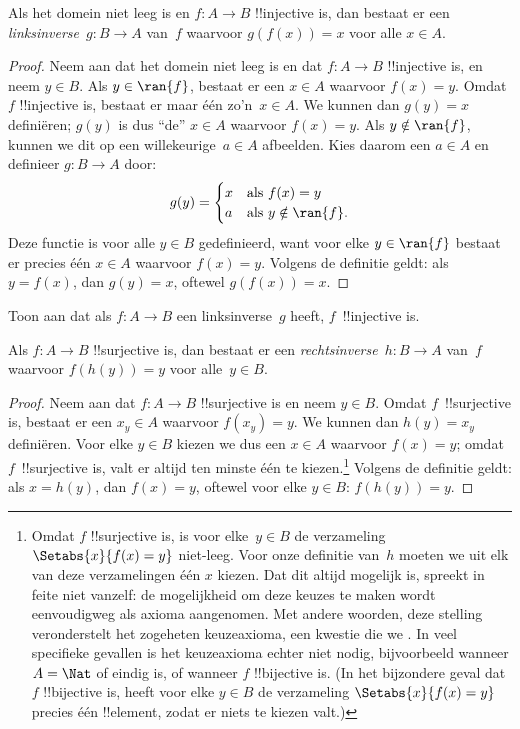 \documentclass[../../../include/open-logic-section]{subfiles}
\begin{document}
\begin{prop}
Als het domein niet leeg is en $f\colon A \to B$ !!{injective} is, dan
bestaat er een
\emph{linksinverse}~$g\colon B \to A$ van~$f$ waarvoor
$g(f(x)) = x$ voor alle $x \in A$.
\end{prop}

\begin{proof}
Neem aan dat het domein niet leeg is en dat $f\colon A \to B$
!!{injective} is, en neem $y \in B$.
Als $y \in \ran{f}$, bestaat er een $x \in A$ waarvoor $f(x) = y$.
Omdat $f$ !!{injective} is, bestaat er maar één zo'n~$x \in A$. We
kunnen dan $g(y) = x$ definiëren; $g(y)$ is dus ``de'' $x \in A$
waarvoor $f(x) = y$. Als $y \notin \ran{f}$, kunnen we dit op een
willekeurige~$a \in A$ afbeelden. Kies daarom een $a \in A$ en
definieer $g\colon B \to A$ door:
\[
g(y) = \begin{cases}
    x & \text{als $f(x) = y$}\\
    a & \text{als $y \notin \ran{f}$.}
\end{cases}
\]
Deze functie is voor alle $y \in B$ gedefinieerd, want voor elke
$y \in \ran{f}$ bestaat er precies één $x \in A$ waarvoor $f(x) = y$.
Volgens de definitie geldt: als $y = f(x)$, dan $g(y) = x$, oftewel
$g(f(x)) = x$.
\end{proof}

\begin{prob}
Toon aan dat als $f\colon A \to B$ een linksinverse~$g$ heeft,
$f$~!!{injective} is.
\end{prob}

\begin{prop}
    Als $f\colon A \to B$ !!{surjective} is, dan bestaat er een
    \emph{rechtsinverse}~$h\colon B \to A$ van~$f$ waarvoor
    $f(h(y)) = y$ voor alle~$y \in B$.
\end{prop}

\begin{proof}
Neem aan dat $f\colon A \to B$ !!{surjective} is en neem $y \in B$.
Omdat $f$~!!{surjective} is, bestaat er een $x_y \in A$ waarvoor
$f(x_y) = y$. We kunnen dan $h(y) = x_y$ definiëren. Voor elke
$y \in B$ kiezen we dus een $x \in A$ waarvoor $f(x) = y$; omdat
$f$~!!{surjective} is, valt er altijd ten minste één te
kiezen.\footnote{Omdat $f$ !!{surjective} is, is voor elke~$y \in B$
de verzameling $\Setabs{x}{f(x) = y}$ niet-leeg. Voor onze definitie
van~$h$ moeten we uit elk van deze verzamelingen één $x$ kiezen. Dat
dit altijd mogelijk is, spreekt in feite niet vanzelf: de mogelijkheid
om deze keuzes te maken wordt eenvoudigweg als axioma aangenomen. Met
andere woorden, deze stelling veronderstelt het zogeheten
keuzeaxioma, een kwestie die we
.
In veel specifieke gevallen is het keuzeaxioma echter niet nodig,
bijvoorbeeld wanneer $A = \Nat$ of eindig is, of wanneer $f$
!!{bijective} is. (In het bijzondere geval dat $f$ !!{bijective} is,
heeft voor elke $y \in B$ de verzameling $\Setabs{x}{f(x) = y}$
precies één !!{element}, zodat er niets te kiezen valt.)}
Volgens de definitie geldt: als $x = h(y)$, dan $f(x) = y$, oftewel
voor elke $y \in B$: $f(h(y)) = y$.
\end{proof}
\end{document}
